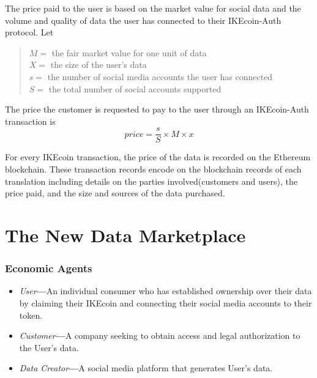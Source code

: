 \documentclass[12pt, letterpaper, twoside]{article}
\begin{document}
The price paid to the user is based on the market value for social data and the volume and quality of data the user has connected to their IKEcoin-Auth protocol. Let \\
\begin{quote}
$M =$ the fair market value for one unit of data\\
$X =$ the size of the user's data\\
$s =$ the number of social media accounts the user has connected\\
$S =$ the total number of social accounts supported\\
\end{quote}
The price the customer is requested to pay to the user through an IKEcoin-Auth transaction is \\
\begin{equation} 
price=\frac{s}{S} \times M \times x 
\end{equation}

For every IKEcoin transaction, the price of the data is recorded on the Ethereum blockchain. These transaction records encode on the blockchain records of each translation including details on the parties involved(customers and users), the price paid, and the size and sources of the data purchased.

\section{The New Data Marketplace}
\subsubsection*{Economic Agents}
\begin{itemize}
\item \textit{User}\textbf{---}An individual consumer who has established ownership over their data by claiming their IKEcoin and connecting their social media accounts to their token.
\item \textit{Customer}\textbf{---}A company seeking to obtain access and legal authorization to the User's data.
\item \textit{Data Creator}\textbf{---}A social media platform that generates User's data.
\end{itemize}
\end{document}
